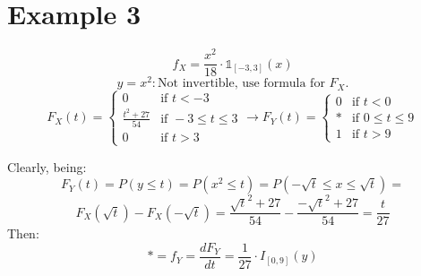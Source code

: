 \section{Example 3}
\[f_X = \frac{x^2}{18} \cdot \mathbb{1}_{[-3,3]}(x)\]
\[y = x^2: \text{Not invertible, use formula for } F_X.\]
\[
F_X(t) =
\begin{cases}
    0 & \text{if } t < -3 \\
    \frac{t^2 + 27}{54} & \text{if } -3 \leq t \leq 3 \\
    0 & \text{if } t > 3
\end{cases}
\rightarrow F_Y(t) = 
\begin{cases}
    0 & \text{if } t < 0 \\
    * & \text{if } 0 \leq t \leq 9 \\
    1 & \text{if } t > 9
\end{cases}
\]

Clearly, being:
\[ F_Y(t) = P(y \leq t) = P(x^2 \leq t) = P(-\sqrt{t} \leq x \leq \sqrt{t}) = \]
\[F_X(\sqrt{t}) - F_X(-\sqrt{t}) = \frac{\sqrt{t}^2 + 27}{54} - \frac{-\sqrt{t}^2 + 27}{54} = \frac{t}{27} \]
Then:
\[ * = f_Y = \frac{dF_Y}{dt} = \frac{1}{27} \cdot I_{[0,9]}(y) 
\]